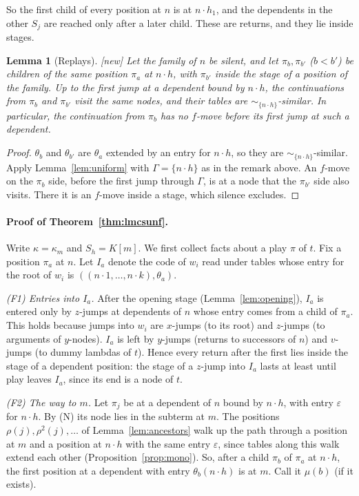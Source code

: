 \documentclass[11pt]{article}
\newcommand{\suc}[2]{#1{\cdot}#2}
\newcommand{\New}{\textsf{[new]}}
\theoremstyle{plain}
\newtheorem{lemma}[theorem]{Lemma}
\theoremstyle{definition}
\theoremstyle{remark}
\begin{document}
So the first child of every position at $n$ is at $\suc n{h_1}$, and
the dependents in the other $S_j$ are reached only after a later child.
These are returns, and they lie inside stages.

\begin{lemma}[Replays]\label{lem:replay}
\New{} Let the family of $n$ be silent, and let $\pi_b,\pi_{b'}$
($b<b'$) be children of the same position $\pi_a$ at $\suc nh$, with
$\pi_{b'}$ inside the stage of a position of the family.  Up to the
first jump at a dependent bound by $\suc nh$, the continuations from
$\pi_b$ and $\pi_{b'}$ visit the same nodes, and their tables are
$\sim_{\{\suc nh\}}$-similar.  In particular, the continuation from
$\pi_b$ has no $f$-move before its first jump at such a dependent.
\end{lemma}
\begin{proof}
$\theta_b$ and $\theta_{b'}$ are $\theta_a$ extended by an entry for
$\suc nh$, so they are $\sim_{\{\suc nh\}}$-similar.  Apply
Lemma~\ref{lem:uniform} with $\Gamma=\{\suc nh\}$ as in the remark
above.  An $f$-move on the $\pi_b$ side, before the first jump through
$\Gamma$, is at a node that the $\pi_{b'}$ side also visits.  There it
is an $f$-move inside a stage, which silence excludes.
\end{proof}

\paragraph{Proof of Theorem~\ref{thm:lmcsunf}.}  Write $\kappa=\kappa_m$
and $S_h=K[m]$.  We first collect facts about a play $\pi$ of $t$.  Fix a
position $\pi_a$ at $n$.  Let $I_a$ denote the code of $w_i$ read under
tables whose entry for the root of $w_i$ is $((\suc n1,\dots,\suc
nk),\theta_a)$.

\emph{(F1) Entries into $I_a$.}  After the opening stage
(Lemma~\ref{lem:opening}), $I_a$ is entered only by $z$-jumps at
dependents of $n$ whose entry comes from a child of $\pi_a$.  This holds
because jumps into $w_i$ are $x$-jumps (to its root) and $z$-jumps (to
arguments of $y$-nodes).  $I_a$ is left by $y$-jumps (returns to
successors of $n$) and $v$-jumps (to dummy lambdas of $t$).  Hence every
return after the first lies inside the stage of a dependent position:
the stage of a $z$-jump into $I_a$ lasts at least until play leaves
$I_a$, since its end is a node of $t$.

\emph{(F2) The way to $m$.}  Let $\pi_j$ be at a dependent of $n$ bound by
$\suc nh$, with entry $\varepsilon$ for $\suc nh$.  By (N) its node lies
in the subterm at $m$.  The positions $\rho(j),\rho^2(j),\dots$ of
Lemma~\ref{lem:ancestors} walk up the path through a position at $m$ and
a position at $\suc nh$ with the same entry $\varepsilon$, since tables
along this walk extend each other (Proposition~\ref{prop:mono}).  So,
after a child $\pi_b$ of $\pi_a$ at $\suc nh$, the first position at a
dependent with entry $\theta_b(\suc nh)$ is at $m$.  Call it $\mu(b)$
(if it exists).
\end{document}
